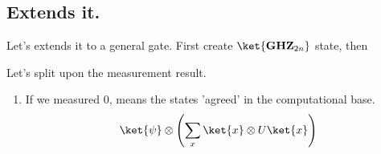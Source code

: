 \documentclass[12pt,a4paper]{article}
\begin{document}
\ifdefined\DEBUG
\subsection{Extends it.}

Let's extends it to a general gate. First create $\ket{\textbf{GHZ}_{2n}}$ state, then 

Let's split upon the measurement result. 
\begin{enumerate}
    \item If we measured $0$, means the states 'agreed' in the computational base. 
      \begin{equation*}
    \begin{split}
          \ket{\psi} \otimes \left( \sum_x\ket{x}\otimes U\ket{x} \right)
    \end{split}
\end{equation*}
\end{enumerate}

\else
\fi


\printbibliography 
\end{document}
